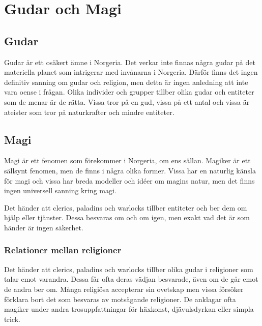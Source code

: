 \section*{Gudar och Magi}
\subsection*{Gudar}
Gudar är ett osäkert ämne i Norgeria. Det verkar inte finnas några gudar på det materiella planet som intrigerar med invånarna i Norgeria. Därför finns det ingen definitiv sanning om gudar och religion, men detta är ingen anledning att inte vara oense i frågan. Olika individer och grupper tillber olika gudar och entiteter som de menar är de rätta. Vissa tror på en gud, vissa på ett antal och vissa är ateister som tror på naturkrafter och mindre entiteter. 

\subsection*{Magi}
Magi är ett fenomen som förekommer i Norgeria, om ens sällan. Magiker är ett sällsynt fenomen, men de finns i några olika former. Vissa har en naturlig känsla för magi och vissa har breda modeller och idéer om magins natur, men det finns ingen universell sanning kring magi. 

Det händer att clerics, paladins och warlocks tillber entiteter och ber dem om hjälp eller tjänster. Dessa besvaras om och om igen, men exakt vad det är som händer är ingen säkerhet.

\subsubsection*{Relationer mellan religioner}
Det händer att clerics, paladins och warlocks tillber olika gudar i religioner som talar emot varandra. Dessa får ofta deras vädjan besvarade, även om de går emot de andra ber om. Många religiösa accepterar sin ovetskap men vissa försöker förklara bort det som besvaras av motsägande religioner. De anklagar ofta magiker under andra trosuppfattningar för häxkonst, djävulsdyrkan eller simpla trick.
